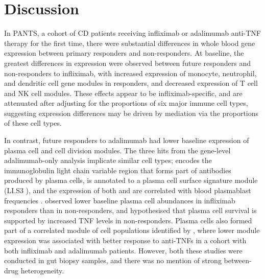 

\section{Discussion}

In \gls{PANTS}, a cohort of \gls{CD} patients receiving infliximab or adalimumab anti-\gls{TNF} therapy for the first time,
there were substantial differences in whole blood gene expression between primary responders and non-responders.
At baseline, the greatest differences in expression were observed between future responders and non-responders to infliximab,
with increased expression of monocyte, neutrophil, and dendritic cell gene modules in responders,
and decreased expression of T cell and \gls{NK} cell modules.
These effects appear to be infliximab-specific, and are attenuated after adjusting for the proportions of six major immune cell types,
suggesting expression differences may be driven by mediation via the proportions of these cell types.

In contrast, future responders to adalimumab had lower baseline expression of plasma cell and cell division modules.
The three hits from the gene-level adalimumab-only analysis implicate similar cell types;
 encodes the immunoglobulin light chain variable region that forms part of antibodies produced by plasma cells,
 is annotated to a plasma cell surface signature module (LI.S3 \autocite{li2013MolecularSignaturesAntibody}), 
and the expression of both  and  are correlated with blood plasmablast frequencies \autocite{tsang2014GlobalAnalysesHuman}.
\textcite{gaujoux2019CellcentredMetaanalysisReveals} observed lower baseline plasma cell abundances in infliximab responders than in non-responders,
and hypothesised that plasma cell survival is supported by increased \gls{TNF} levels in non-responders.
Plasma cells also formed part of a correlated module of cell populations identified by \textcite{martin2019SingleCellAnalysisCrohn},
where lower module expression was associated with better response to anti-\glspl{TNF} in a cohort with both infliximab and adalimumab patients.
However, both these studies were conducted in gut biopsy samples, and there was no mention of strong between-drug heterogeneity.

